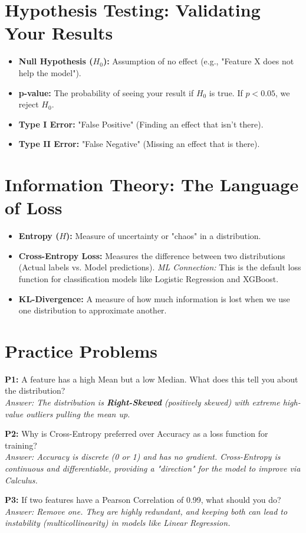 \documentclass{article}
\begin{document}
\section{Hypothesis Testing: Validating Your Results}
\begin{itemize}
    \item \textbf{Null Hypothesis ($H_0$):} Assumption of no effect (e.g., "Feature X does not help the model").
    \item \textbf{p-value:} The probability of seeing your result if $H_0$ is true. If $p < 0.05$, we reject $H_0$.
    \item \textbf{Type I Error:} "False Positive" (Finding an effect that isn't there).
    \item \textbf{Type II Error:} "False Negative" (Missing an effect that is there).
\end{itemize}

\section{Information Theory: The Language of Loss}
\begin{itemize}
    \item \textbf{Entropy ($H$):} Measure of uncertainty or "chaos" in a distribution.
    \item \textbf{Cross-Entropy Loss:} Measures the difference between two distributions (Actual labels vs. Model predictions). 
    \textit{ML Connection:} This is the default loss function for classification models like Logistic Regression and XGBoost.
    \item \textbf{KL-Divergence:} A measure of how much information is lost when we use one distribution to approximate another.
\end{itemize}

\section{Practice Problems}
\textbf{P1:} A feature has a high Mean but a low Median. What does this tell you about the distribution? \\
\textit{Answer: The distribution is \textbf{Right-Skewed} (positively skewed) with extreme high-value outliers pulling the mean up.}

\textbf{P2:} Why is Cross-Entropy preferred over Accuracy as a loss function for training? \\
\textit{Answer: Accuracy is discrete (0 or 1) and has no gradient. Cross-Entropy is continuous and differentiable, providing a "direction" for the model to improve via Calculus.}

\textbf{P3:} If two features have a Pearson Correlation of 0.99, what should you do? \\
\textit{Answer: Remove one. They are highly redundant, and keeping both can lead to instability (multicollinearity) in models like Linear Regression.}
\end{document}
